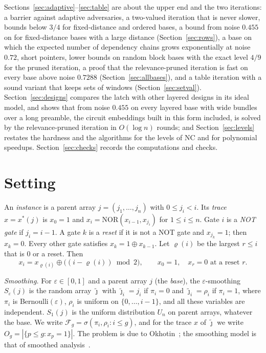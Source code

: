 \documentclass[11pt]{amsart}
\theoremstyle{definition}
\theoremstyle{remark}
\newcommand{\eps}{\varepsilon}
\newcommand{\jt}{\tilde{\jmath}}
\newcommand{\NOR}{\mathrm{NOR}}
\newcommand{\cF}{\mathcal{F}}
\begin{document}
Sections~\ref{sec:adaptive}--\ref{sec:table} are about the upper end and the two
iterations: a barrier against adaptive adversaries, a two-valued iteration that is never slower,
bounds below $3/4$ for fixed-distance and ordered bases, a bound from noise $0.455$ on for
fixed-distance bases with a large distance (Section~\ref{sec:rows}), a base on which the expected number of
dependency chains grows exponentially at noise $0.72$, short pointers, lower bounds on random
block bases with the exact level $4/9$ for the pruned iteration, a proof that the relevance-pruned
iteration is fast on every base above noise $0.7288$ (Section~\ref{sec:allbases}), and a table
iteration with a sound variant that keeps sets of windows (Section~\ref{sec:setval}).
Section~\ref{sec:designs} compares the latch with other layered designs in its ideal model, and
shows that from noise $0.455$ on every layered base with wide bundles over a long preamble, the
circuit embeddings built in this form included, is solved by the relevance-pruned iteration in
$O(\log n)$ rounds; and
Section~\ref{sec:levels} restates the hardness and the algorithms for the levels of NC and for
polynomial speedups. Section~\ref{sec:checks} records the computations and checks.

\section{Setting}\label{sec:setting}

An \emph{instance} is a parent array $j=(j_1,\dots,j_n)$ with $0\le j_i<i$. Its \emph{trace} $x=x^*(j)$
is $x_0=1$ and $x_i=\NOR(x_{i-1},x_{j_i})$ for $1\le i\le n$. Gate $i$ is a \emph{NOT gate} if
$j_i=i-1$. A gate $k$ is a \emph{reset} if it is not a NOT gate and $x_{j_k}=1$; then $x_k=0$. Every
other gate satisfies $x_k=1\oplus x_{k-1}$. Let $\varrho(i)$ be the largest $r\le i$ that is $0$ or
a reset. Then
\begin{equation}\label{eq:reset}
x_i=x_{\varrho(i)}\oplus\bigl((i-\varrho(i))\bmod 2\bigr),\qquad x_0=1,\quad x_r=0\text{ at a reset }r .
\end{equation}

\emph{Smoothing.} For $\eps\in[0,1]$ and a parent array $j$ (the \emph{base}), the
$\eps$-smoothing $S_\eps(j)$ is the random array $\jt$ with $\jt_i=j_i$ if $\pi_i=0$ and
$\jt_i=\rho_i$ if $\pi_i=1$, where $\pi_i$ is Bernoulli$(\eps)$, $\rho_i$ is uniform on
$\{0,\dots,i-1\}$, and all these variables are independent. $S_1(j)$ is the uniform distribution
$U_n$ on parent arrays, whatever the base. We write $\cF_g=\sigma(\pi_i,\rho_i:i\le g)$, and for
the trace $x$ of $\jt$ we write $O_g=|\{p\le g:x_p=1\}|$. The problem is due to
Okhotin~\cite{okhotin}; the smoothing model is that of smoothed analysis~\cite{gb-spielmanteng}.
\end{document}
